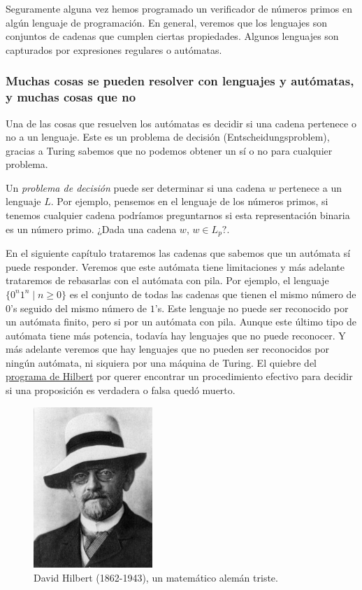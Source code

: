 \begin{enumerate}
    Seguramente alguna vez hemos programado un verificador de números primos en algún lenguaje de programación. En general, 
    veremos que los lenguajes son conjuntos de cadenas que cumplen ciertas propiedades. Algunos lenguajes son capturados por expresiones regulares o autómatas.

    \subsubsection{Muchas cosas se pueden resolver con lenguajes y autómatas, y muchas cosas que no}

Una de las cosas que resuelven los autómatas es decidir si una cadena pertenece 
o no a un lenguaje. Este es un problema de decisión (Entscheidungsproblem), 
gracias a Turing sabemos que no podemos obtener un sí o no para cualquier problema. 

Un \textit{problema de decisión} puede ser determinar si una cadena $w$ pertenece a un lenguaje $L$. 
Por ejemplo, pensemos en el lenguaje de los números primos, si tenemos cualquier cadena podríamos preguntarnos
si esta representación binaria es un número primo. ¿Dada una cadena $w$, $w \in L_p?$.  

En el siguiente capítulo trataremos las cadenas que sabemos que un autómata sí puede responder. 
Veremos que este autómata tiene limitaciones y más adelante trataremos de rebasarlas con el autómata con pila.
Por ejemplo, el lenguaje $\{0^n1^n \mid n \geq 0\}$ es el conjunto de todas las cadenas que tienen el mismo número de $0$'s seguido del mismo número de $1$'s.
Este lenguaje no puede ser reconocido por un autómata finito, pero si por un autómata con pila. Aunque este último tipo de autómata tiene más potencia, todavía hay lenguajes que no puede reconocer.
Y más adelante veremos que hay lenguajes que no pueden ser reconocidos por ningún autómata, ni siquiera por una máquina de Turing. El quiebre del \href{https://plato.stanford.edu/entries/hilbert-program/}{programa de Hilbert} por querer encontrar
un procedimiento efectivo para decidir si una proposición es verdadera o falsa quedó muerto. 

\begin{figure}
    \centering
    \includegraphics[width=0.4\textwidth]{images/Hilbert.jpg}
    \caption{David Hilbert (1862-1943), un matemático alemán triste.}
\end{figure}

\end{enumerate}

